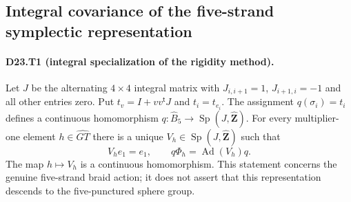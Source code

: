 \subsection{Integral covariance of the five-strand symplectic representation}

\paragraph{D23.T1 (integral specialization of the rigidity method).}
Let $J$ be the alternating $4\times4$ integral matrix with
$J_{i,i+1}=1$, $J_{i+1,i}=-1$ and all other entries zero.
Put $t_v=I+vv^{\mathsf t}J$ and $t_i=t_{e_i}$.
The assignment $q(\sigma_i)=t_i$ defines a continuous homomorphism
$q:\widehat B_5\to\operatorname{Sp}(J,\widehat{\mathbf Z})$.
For every multiplier-one element $h\in\widehat{GT}$ there is a unique
$V_h\in\operatorname{Sp}(J,\widehat{\mathbf Z})$ such that
\[
V_he_1=e_1,\qquad q\Phi_h=\operatorname{Ad}(V_h)q.
\]
The map $h\mapsto V_h$ is a continuous homomorphism.
This statement concerns the genuine five-strand braid action; it does
not assert that this representation descends to the five-punctured
sphere group.

